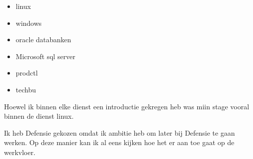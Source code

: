 \begin{itemize}
    \item linux
    \item windows
    \item oracle databanken
    \item Microsoft sql server
    \item prodctl
    \item techbu
\end{itemize}

Hoewel ik binnen elke dienst een introductie gekregen heb was miin stage vooral binnen de dienst linux.

Ik heb Defensie gekozen omdat ik ambitie heb om later bij Defensie te gaan werken. Op deze manier kan ik al eens kijken hoe het er aan toe gaat op de werkvloer.